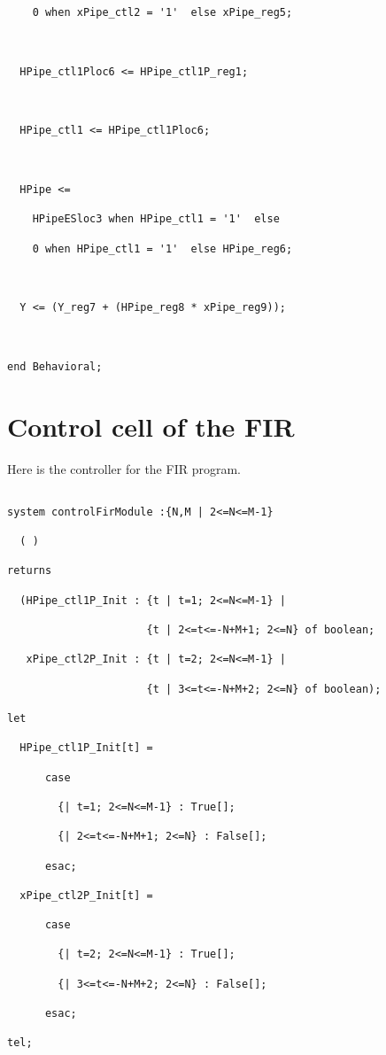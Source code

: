 \begin{verbatim}
    0 when xPipe_ctl2 = '1'  else xPipe_reg5;



  HPipe_ctl1Ploc6 <= HPipe_ctl1P_reg1;



  HPipe_ctl1 <= HPipe_ctl1Ploc6;



  HPipe <= 

    HPipeESloc3 when HPipe_ctl1 = '1'  else 

    0 when HPipe_ctl1 = '1'  else HPipe_reg6;



  Y <= (Y_reg7 + (HPipe_reg8 * xPipe_reg9));



end Behavioral;

\end{verbatim}



\section{Control cell of the FIR}

Here is the controller for the FIR program. 

\begin{verbatim}

system controlFirModule :{N,M | 2<=N<=M-1}

  ( )

returns

  (HPipe_ctl1P_Init : {t | t=1; 2<=N<=M-1} | 

                      {t | 2<=t<=-N+M+1; 2<=N} of boolean; 

   xPipe_ctl2P_Init : {t | t=2; 2<=N<=M-1} | 

                      {t | 3<=t<=-N+M+2; 2<=N} of boolean);

let

  HPipe_ctl1P_Init[t] = 

      case

        {| t=1; 2<=N<=M-1} : True[];

        {| 2<=t<=-N+M+1; 2<=N} : False[];

      esac;

  xPipe_ctl2P_Init[t] = 

      case

        {| t=2; 2<=N<=M-1} : True[];

        {| 3<=t<=-N+M+2; 2<=N} : False[];

      esac;

tel;

\end{verbatim}

